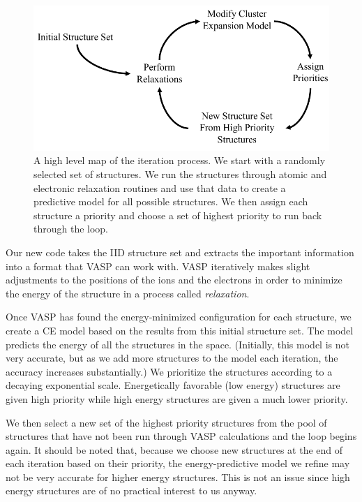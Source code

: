 \documentclass[oneside, noacknowlegments]{BYUPhys}
\begin{document}
\begin{figure}
    \centerline{\includegraphics{Erik_Swenson_Schematic}}
    \caption{A high level map of the iteration process. We start 
    		with a randomly selected set of structures. We run the 
    		structures through atomic and electronic relaxation 
    		routines and use that data to create a predictive model for 
    		all possible structures. We then assign each structure a 
    		priority and choose a set of highest priority to run back 
    		through the loop.}
	\label{fig:ProcessDiagram}
\end{figure}

Our new code takes the IID structure set and extracts the important 
information into a format that VASP can work with. VASP iteratively 
makes slight adjustments to the positions of the ions and the 
electrons in order to minimize the energy of the structure in a 
process called \textit{relaxation}. 

Once VASP has found the energy-minimized configuration for each 
structure, we create a CE model based on the results from this 
initial structure set. The model predicts the energy of all the 
structures in the space. (Initially, this model is not very 
accurate, but as we add more structures to the model each 
iteration, the accuracy increases substantially.) We prioritize the 
structures according to a decaying exponential scale. Energetically 
favorable (low energy) structures are given high priority while 
high energy structures are given a much lower priority.

We then select a new set of the highest priority structures from 
the pool of structures that have not been run through VASP 
calculations and the loop begins again. It should be noted that, 
because we choose new structures at the end of each iteration based 
on their priority, the energy-predictive model we refine may not be 
very accurate for higher energy structures. This is not an issue 
since high energy structures are of no practical interest to us 
anyway. 
\end{document}
